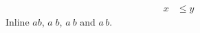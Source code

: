 \documentclass{article}
\begin{document}
\begin{align}
  \!\!x &\leq \! y
\end{align}
Inline $a\!b$, $a\;b$, $a\:b$ and $a\,b$.
\end{document}
